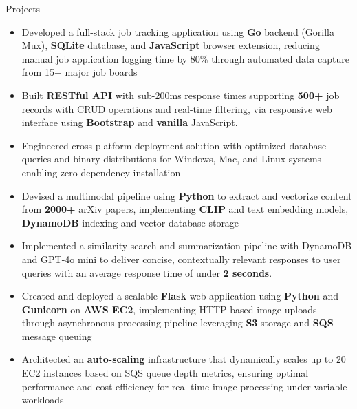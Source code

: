 \documentclass{resume}
\begin{document}
\begin{experienceSection}{Projects}

    \projectItem[
        title=JobTrail - Go-based Job Tracker,
        duration={May 2025},
    ]
    \begin{itemize}
        \vspace{-0.5em}
        \itemsep -6pt {}
        \item Developed a full-stack job tracking application using \textbf{Go} backend (Gorilla Mux), \textbf{SQLite} database, and \textbf{JavaScript} browser extension, reducing manual job application logging time by 80\% through automated data capture from 15+ major job boards
        \item Built \textbf{RESTful API} with sub-200ms response times supporting \textbf{500+} job records with CRUD operations and real-time filtering, via responsive web interface using \textbf{Bootstrap} and \textbf{vanilla} JavaScript.
        \item Engineered cross-platform deployment solution with optimized database queries and binary distributions for Windows, Mac, and Linux systems enabling zero-dependency installation
    \end{itemize}

    \projectItem[
        title=RAG Implementation for arXiv Papers,
        duration={Nov 2024},
    ]
    \begin{itemize}
        \vspace{-0.5em}
        \itemsep -6pt {}
        \item Devised a multimodal pipeline using \textbf{Python} to extract and vectorize content from \textbf{2000+} arXiv papers, implementing \textbf{CLIP} and text embedding models, \textbf{DynamoDB} indexing and vector database storage
        \item Implemented a similarity search and summarization pipeline with DynamoDB and GPT-4o mini to deliver concise, contextually relevant responses to user queries with an average response time of under \textbf{2 seconds}.
    \end{itemize}

    
    \projectItem[
        title=AWS-Based Face Recognition App,
        duration={May 2024},
    ]
    \begin{itemize}
        \vspace{-0.5em}
        \itemsep -6pt {}
        \item Created and deployed a scalable \textbf{Flask} web application using \textbf{Python} and \textbf{Gunicorn} on\textbf{ AWS EC2}, implementing HTTP-based image uploads through asynchronous processing pipeline leveraging \textbf{S3} storage and \textbf{SQS} message queuing
        \item Architected an \textbf{auto-scaling} infrastructure that dynamically scales up to 20 EC2 instances based on SQS queue depth metrics, ensuring optimal performance and cost-efficiency for real-time image processing under variable workloads
    \end{itemize}


\end{experienceSection}
\end{document}
